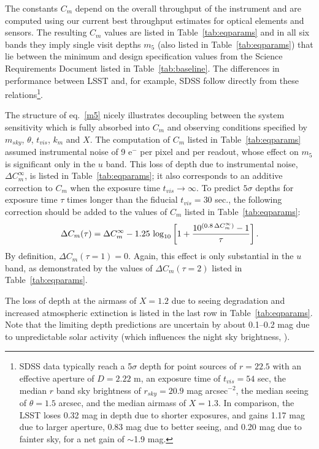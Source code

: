 The constants $C_m$ depend on the overall throughput of the instrument
and are computed using our current best throughput estimates for
optical elements and sensors. The resulting $C_m$ values are listed in Table~\ref{tab:eqparams}
and in all six bands they imply single visit depths $m_5$ (also listed
in Table~\ref{tab:eqparams}) that lie between the minimum and design
specification values from the Science Requirements
Document listed in Table~\ref{tab:baseline}.
The differences in performance between LSST and, for example, SDSS
follow directly from these relations\footnote{SDSS data
typically reach a 5$\sigma$ depth for point sources of $r=22.5$
with an effective aperture of $D=2.22$ m, an exposure time of $t_{vis}=54$
sec, the median $r$ band sky brightness of $r_{sky}=20.9$ mag arcsec$^{-2}$,
the median seeing of $\theta=1.5$ arcsec, and the median airmass of $X=1.3$.
In comparison, the LSST loses 0.32 mag in depth due to shorter exposures,
and gains 1.17 mag due to larger aperture, 0.83 mag due to better
seeing, and 0.20 mag due to fainter sky, for a net gain of $\sim$1.9 mag.}.

The structure of eq.~\ref{m5} nicely illustrates decoupling between the system
sensitivity which is fully absorbed into $C_m$ and observing conditions
specified by $m_{sky}$, $\theta$, $t_{vis}$, $k_m$
and $X$. The computation of $C_m$ listed in Table~\ref{tab:eqparams} assumed instrumental noise of
9 e$^-$ per pixel and per readout, whose effect on $m_5$ is
significant only in the $u$ band.
 This loss of depth due to instrumental noise, $\Delta C^{\infty}_m$,
is listed in Table~\ref{tab:eqparams}; it also corresponds to an additive correction to $C_m$ when the
exposure time $t_{vis} \rightarrow \infty$. To predict $5\sigma$ depths for
exposure time $\tau$ times longer than the fiducial $t_{vis} = 30$ sec., the
following correction should be added to the values of $C_m$ listed in Table~\ref{tab:eqparams}:
\begin{equation}
\label{eq:DCm}
 \Delta C_m(\tau) = \Delta C^\infty_m - 1.25\,\log_{10}\left[1 + {10^{(0.8 \, \Delta C^\infty_m)} - 1 \over \tau}  \right].
\end{equation}
By definition, $\Delta C_m(\tau=1)=0$. Again, this effect is only substantial in the $u$
band, as demonstrated by the values of $\Delta C_m(\tau = 2)$ listed in Table~\ref{tab:eqparams}.

The loss of depth at the airmass of $X=1.2$ due to seeing degradation
and increased atmospheric extinction is listed in the last row in Table~\ref{tab:eqparams}. Note
that the limiting depth predictions are uncertain by about 0.1--0.2 mag
due to unpredictable solar
activity (which influences the night sky brightness,
\citet{2008A&A...481..575P}).




